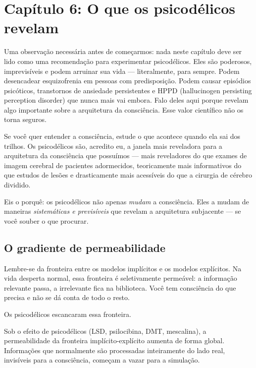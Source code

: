 \documentclass[11pt, twoside, openright]{book}
\begin{document}
\chapter*{Capítulo 6: O que os psicodélicos revelam}

Uma observação necessária antes de começarmos: nada neste capítulo deve ser lido como uma recomendação para experimentar psicodélicos. Eles são poderosos, imprevisíveis e podem arruinar sua vida --- literalmente, para sempre. Podem desencadear esquizofrenia em pessoas com predisposição. Podem causar episódios psicóticos, transtornos de ansiedade persistentes e HPPD (hallucinogen persisting perception disorder) que nunca mais vai embora. Falo deles aqui porque revelam algo importante sobre a arquitetura da consciência. Esse valor científico não os torna seguros.

Se você quer entender a consciência, estude o que acontece quando ela sai dos trilhos. Os psicodélicos são, acredito eu, a janela mais reveladora para a arquitetura da consciência que possuímos --- mais reveladores do que exames de imagem cerebral de pacientes adormecidos, teoricamente mais informativos do que estudos de lesões e drasticamente mais acessíveis do que a cirurgia de cérebro dividido.

Eis o porquê: os psicodélicos não apenas \textit{mudam} a consciência. Eles a mudam de maneiras \textit{sistemáticas e previsíveis} que revelam a arquitetura subjacente --- se você souber o que procurar.

\section*{O gradiente de permeabilidade}

Lembre-se da fronteira entre os modelos implícitos e os modelos explícitos. Na vida desperta normal, essa fronteira é seletivamente permeável: a informação relevante passa, a irrelevante fica na biblioteca. Você tem consciência do que precisa e não se dá conta de todo o resto.

Os psicodélicos escancaram essa fronteira.

Sob o efeito de psicodélicos (LSD, psilocibina, DMT, mescalina), a permeabilidade da fronteira implícito-explícito aumenta de forma global. Informações que normalmente são processadas inteiramente do lado real, invisíveis para a consciência, começam a vazar para a simulação.
\end{document}
